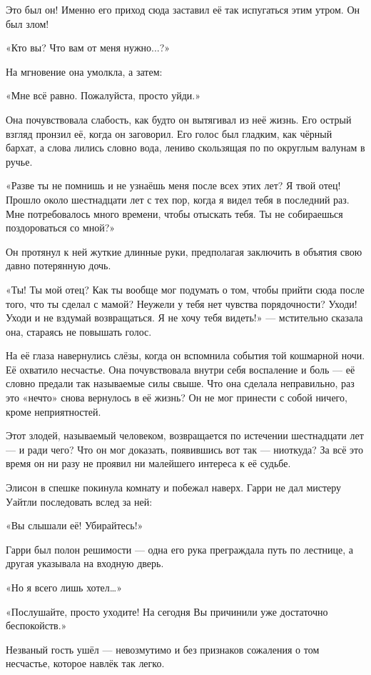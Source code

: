\documentclass[a5paper, 9pt,
final, openany, twoside=true]{memoir}
\begin{document}
Это был он! Именно его приход сюда заставил её так испугаться этим утром. Он был злом!

«Кто вы? Что вам от меня нужно...?»

На мгновение она умолкла, а затем:

«Мне всё равно. Пожалуйста, просто уйди.»

Она почувствовала слабость, как будто он вытягивал из неё жизнь. Его острый взгляд пронзил её, когда он заговорил. Его голос был гладким, как чёрный бархат, а слова лились словно вода, лениво скользящая по по округлым валунам в ручье.

«Разве ты не помнишь и не узнаёшь меня после всех этих лет? Я твой отец! Прошло около шестнадцати лет с тех пор, когда я видел тебя в последний раз. Мне потребовалось много времени, чтобы отыскать тебя. Ты не собираешься поздороваться со мной?»

Он протянул к ней жуткие длинные руки, предполагая заключить в объятия свою давно потерянную дочь.

«Ты! Ты мой отец? Как ты вообще мог подумать о том, чтобы прийти сюда после того, что ты сделал с мамой? Неужели у тебя нет чувства порядочности? Уходи! Уходи и не вздумай возвращаться. Я не хочу тебя видеть!» — мстительно сказала она, стараясь не повышать голос.

На её глаза навернулись слёзы, когда он вспомнила события той кошмарной ночи. Её охватило несчастье. Она почувствовала внутри себя воспаление и боль — её словно предали так называемые силы свыше. Что она сделала неправильно, раз это «нечто» снова вернулось в её жизнь? Он не мог принести с собой ничего, кроме неприятностей.

Этот злодей, называемый человеком, возвращается по истечении шестнадцати лет — и ради чего? Что он мог доказать, появившись вот так — ниоткуда? За всё это время он ни разу не проявил ни малейшего интереса к её судьбе.

Элисон в спешке покинула комнату и побежал наверх. Гарри не дал мистеру Уайтли последовать вслед за ней:

«Вы слышали её! Убирайтесь!»

Гарри был полон решимости — одна его рука преграждала путь по лестнице, а другая указывала на входную дверь.

«Но я всего лишь хотел…»

«Послушайте, просто уходите! На сегодня Вы причинили уже достаточно беспокойств.»

Незваный гость ушёл — невозмутимо и без признаков сожаления о том несчастье, которое навлёк так легко.
\end{document}
